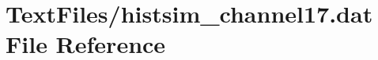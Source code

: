 \hypertarget{TextFiles_2histsim__channel17_8dat}{}\section{Text\+Files/histsim\+\_\+channel17.dat File Reference}
\label{TextFiles_2histsim__channel17_8dat}
